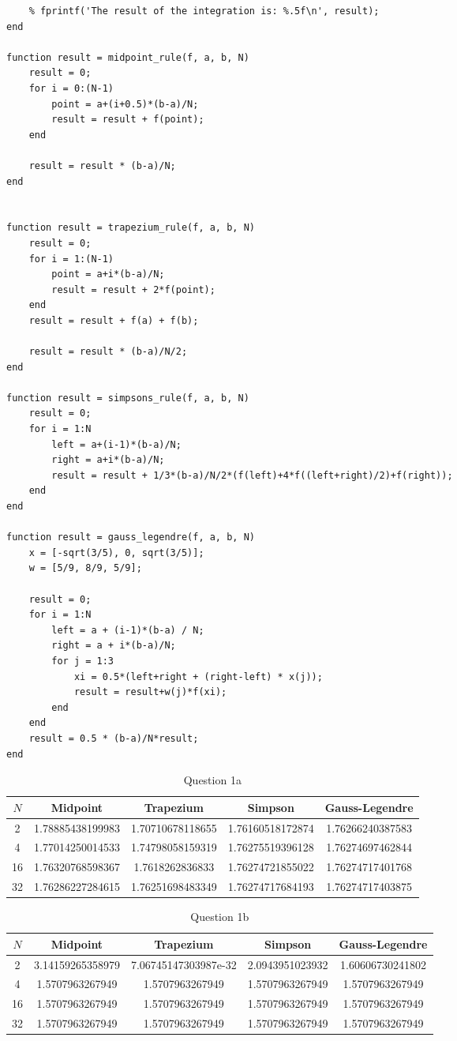\documentclass[letterpaper, reqno,11pt]{article}
\begin{document}
\begin{lstlisting}
    % fprintf('The result of the integration is: %.5f\n', result);
end

function result = midpoint_rule(f, a, b, N)
    result = 0;
    for i = 0:(N-1)
        point = a+(i+0.5)*(b-a)/N;
        result = result + f(point);
    end

    result = result * (b-a)/N;
end


function result = trapezium_rule(f, a, b, N)
    result = 0;
    for i = 1:(N-1)
        point = a+i*(b-a)/N;
        result = result + 2*f(point);
    end
    result = result + f(a) + f(b);

    result = result * (b-a)/N/2;
end

function result = simpsons_rule(f, a, b, N)
    result = 0;
    for i = 1:N
        left = a+(i-1)*(b-a)/N;
        right = a+i*(b-a)/N;
        result = result + 1/3*(b-a)/N/2*(f(left)+4*f((left+right)/2)+f(right));
    end
end

function result = gauss_legendre(f, a, b, N)
    x = [-sqrt(3/5), 0, sqrt(3/5)];
    w = [5/9, 8/9, 5/9];

    result = 0;
    for i = 1:N
        left = a + (i-1)*(b-a) / N;
        right = a + i*(b-a)/N;
        for j = 1:3
            xi = 0.5*(left+right + (right-left) * x(j));
            result = result+w(j)*f(xi);
        end
    end
    result = 0.5 * (b-a)/N*result;
end
\end{lstlisting}

\begin{table}
\centering
\begin{tabular}{|c|c|c|c|c|}
\hline
$N$ & Midpoint & Trapezium & Simpson & Gauss-Legendre \\
\hline
2 & 1.78885438199983 & 1.70710678118655 & 1.76160518172874 & 1.76266240387583 \\
\hline
4 & 1.77014250014533 & 1.74798058159319 & 1.76275519396128 & 1.76274697462844 \\
\hline
16 & 1.76320768598367 & 1.7618262836833 & 1.76274721855022 & 1.76274717401768 \\
\hline
32 & 1.76286227284615 & 1.76251698483349 & 1.76274717684193 & 1.76274717403875 \\
\hline
\end{tabular}
\caption{Question 1a}
\label{tab:q1a}
\end{table}

\begin{table}
\centering
\begin{tabular}{|c|c|c|c|c|}
\hline
$N$ & Midpoint & Trapezium & Simpson & Gauss-Legendre \\
\hline
2 & 3.14159265358979 & 7.06745147303987e-32 & 2.0943951023932 & 1.60606730241802 \\
\hline
4 & 1.5707963267949 & 1.5707963267949 & 1.5707963267949 & 1.5707963267949 \\
\hline
16 & 1.5707963267949 & 1.5707963267949 & 1.5707963267949 & 1.5707963267949 \\
\hline
32 & 1.5707963267949 & 1.5707963267949 & 1.5707963267949 & 1.5707963267949 \\
\hline
\end{tabular}
\caption{Question 1b}
\label{tab:q1b}
\end{table}
\end{document}

